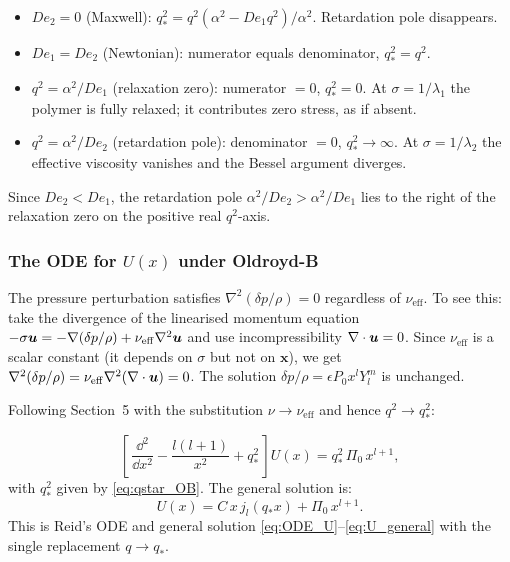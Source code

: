 \begin{notebox}[Limits of $q_*^2$]
\begin{itemize}
  \item $De_2 = 0$ (Maxwell): $q_*^2 = q^2(\alpha^2 - De_1 q^2)/\alpha^2$.
        Retardation pole disappears.
  \item $De_1 = De_2$ (Newtonian): numerator equals denominator,
        $q_*^2 = q^2$.
  \item $q^2 = \alpha^2/De_1$ (relaxation zero): numerator $= 0$,
        $q_*^2 = 0$. At $\sigma = 1/\lambda_1$ the polymer is fully
        relaxed; it contributes zero stress, as if absent.
  \item $q^2 = \alpha^2/De_2$ (retardation pole): denominator $= 0$,
        $q_*^2\to\infty$. At $\sigma = 1/\lambda_2$ the effective
        viscosity vanishes and the Bessel argument diverges.
\end{itemize}
Since $De_2 < De_1$, the retardation pole $\alpha^2/De_2 > \alpha^2/De_1$
lies to the right of the relaxation zero on the positive real $q^2$-axis.
\end{notebox}

\subsubsection{The ODE for $U(x)$ under Oldroyd-B}

\begin{derivbox}
The pressure perturbation satisfies $\nabla^2(\delta p/\rho) = 0$ regardless
of $\nu_{\mathrm{eff}}$. To see this: take the divergence of the linearised
momentum equation
$-\sigma\bm{u} = -\nabla(\delta p/\rho) + \nu_{\mathrm{eff}}\nabla^2\bm{u}$
and use incompressibility $\nabla\cdot\bm{u} = 0$. Since $\nu_{\mathrm{eff}}$
is a scalar constant (it depends on $\sigma$ but not on $\mathbf{x}$), we get
$\nabla^2(\delta p/\rho) = \nu_{\mathrm{eff}}\nabla^2(\nabla\cdot\bm{u}) = 0$.
The solution $\delta p/\rho = \epsilon P_0 x^l Y_l^m$ is unchanged.
\end{derivbox}

Following Section~5 with the substitution $\nu \to \nu_{\mathrm{eff}}$
and hence $q^2 \to q_*^2$:

\begin{keybox}
\begin{equation}
  \left[\,\frac{\dd^2}{\dd x^2} - \frac{l(l+1)}{x^2} + q_*^2\,\right]U(x)
  = q_*^2\,\Pi_0\,x^{l+1},
  \label{eq:ODE_OB}
\end{equation}
with $q_*^2$ given by \eqref{eq:qstar_OB}. The general solution is:
\begin{equation}
  U(x) = C\,x\,j_l(q_* x) + \Pi_0\,x^{l+1}.
  \label{eq:U_OB}
\end{equation}
This is Reid's ODE and general solution \eqref{eq:ODE_U}--\eqref{eq:U_general}
with the single replacement $q \to q_*$.
\end{keybox}

